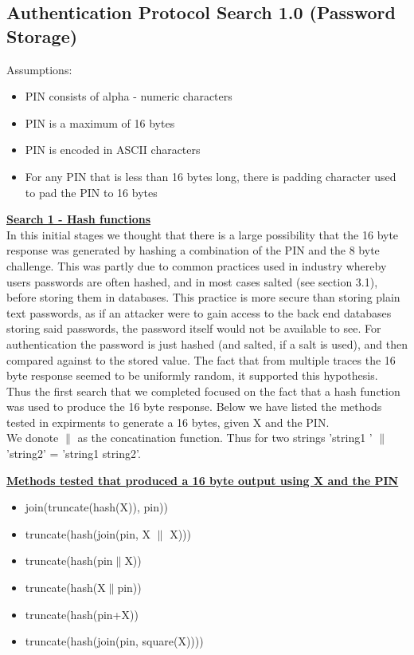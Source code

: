 \documentclass[bsc,frontabs,twoside,singlespacing,parskip,deptreport]{infthesis}     %
\begin{document}
\subsection{Authentication Protocol Search 1.0 (Password Storage)}
Assumptions:\\
\begin{itemize}
\item PIN consists of alpha - numeric characters
\item PIN is a maximum of 16 bytes
\item PIN is encoded in ASCII characters
\item For any PIN that is less than 16 bytes long, there is padding character used to pad the PIN to 16 bytes\\
\end{itemize}

\textbf{\underline{Search 1 - Hash functions}}\\
\noindent In this initial stages we thought that there is a large possibility that the 16 byte response was generated by hashing a combination of the PIN and the 8 byte challenge. This was partly due to common practices used in industry whereby users passwords are often hashed, and in most cases salted (see section 3.1), before storing them in databases. This practice is more secure than storing plain text passwords, as if an attacker were to gain access to the back end databases storing said passwords, the password itself would not be available to see. For authentication the password is just hashed (and salted, if a salt is used), and then compared against to the stored value. The fact that from multiple traces the 16 byte response seemed to be uniformly random, it supported this hypothesis.\\

Thus the first search that we completed focused on the fact that a hash function was used to produce the 16 byte response. Below we have listed the methods tested in expirments to generate a 16 bytes, given X and the PIN.\\

We donote $\|$ as the concatination function. Thus for two strings 'string1 ' $\|$ 'string2' = 'string1 string2'.

\textbf{\underline{Methods tested that produced a 16 byte output using X and the PIN}}
\begin{itemize}
\item join(truncate(hash(X)), pin))
\item truncate(hash(join(pin, X $\|$ X)))
\item truncate(hash(pin$\|$X))
\item truncate(hash(X$\|$pin))
\item truncate(hash(pin+X))
\item truncate(hash(join(pin, square(X))))
\end{itemize}
\end{document}
